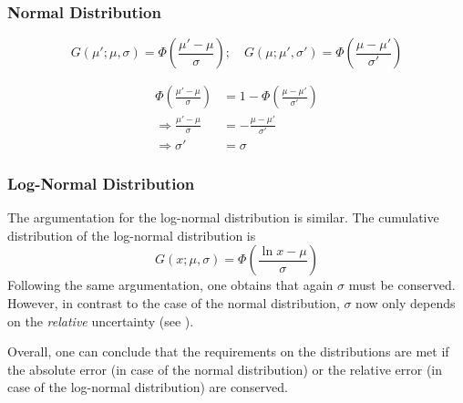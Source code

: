 \subsubsection{Normal Distribution}

\begin{equation}
    G(\mu'; \mu, \sigma) = \Phi\left(\frac{\mu' - \mu}{\sigma}\right); \quad
    G(\mu; \mu', \sigma') = \Phi\left(\frac{\mu - \mu'}{\sigma'}\right)
\end{equation}

\begin{align}
    \Phi\left(\frac{\mu' - \mu}{\sigma}\right) &= 1 - \Phi\left(\frac{\mu - \mu'}{\sigma'}\right) \\
    \Rightarrow \frac{\mu' - \mu}{\sigma} &= - \frac{\mu - \mu'}{\sigma'} \\
    \Rightarrow \sigma' &= \sigma
\end{align} 

\subsubsection{Log-Normal Distribution}

The argumentation for the log-normal distribution is similar. The cumulative distribution of the log-normal distribution is 
\begin{equation}
    G(x; \mu, \sigma) = \Phi\left(\frac{\ln x - \mu}{\sigma}\right)
\end{equation}
Following the same argumentation, one obtains that again $\sigma$ must be conserved. However, in contrast to the case of the normal distribution, $\sigma$ now only depends on the \emph{relative} uncertainty (see ).

Overall, one can conclude that the requirements on the distributions are met if the absolute error (in case of the normal distribution) or the relative error (in case of the log-normal distribution) are conserved.
